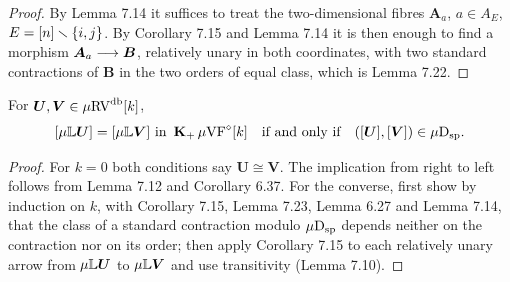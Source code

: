 \begin{proof}
\leanok
By Lemma 7.14 it suffices to treat the two-dimensional fibres $\boldsymbol{A}_a$, $a \in A_E$, $E = [n] \smallsetminus \{i, j\}$. By Corollary 7.15 and Lemma 7.14 it is then enough to find a morphism $\boldsymbol{A}_a \longrightarrow \boldsymbol{B}$, relatively unary in both coordinates, with two standard contractions of $\boldsymbol{B}$ in the two orders of equal class, which is Lemma 7.22.
\end{proof}

\setcounter{theorem}{23}
\begin{proposition}
\label{kernel-L}
\leanok
{}
For $\boldsymbol{U}, \boldsymbol{V} \in \mu\mathrm{RV}^{\operatorname{db}}[k]$,\[ [\mu\mathbb{L} \boldsymbol{U}] = [\mu\mathbb{L} \boldsymbol{V}] \text{ in } \operatorname{\mathbf{K}_+} \mu\mathrm{VF}^\diamond[k] \quad \text{if and only if} \quad ([\boldsymbol{U}], [\boldsymbol{V}]) \in \mu\mathrm{D}_{\mathrm{sp}}. \]
\end{proposition}

\begin{proof}
\leanok
For $k = 0$ both conditions say $\boldsymbol{U} \cong \boldsymbol{V}$. The implication from right to left follows from Lemma 7.12 and Corollary 6.37. For the converse, first show by induction on $k$, with Corollary 7.15, Lemma 7.23, Lemma 6.27 and Lemma 7.14, that the class of a standard contraction modulo $\mu\mathrm{D}_{\mathrm{sp}}$ depends neither on the contraction nor on its order; then apply Corollary 7.15 to each relatively unary arrow from $\mu\mathbb{L} \boldsymbol{U}$ to $\mu\mathbb{L} \boldsymbol{V}$ and use transitivity (Lemma 7.10).
\end{proof}

